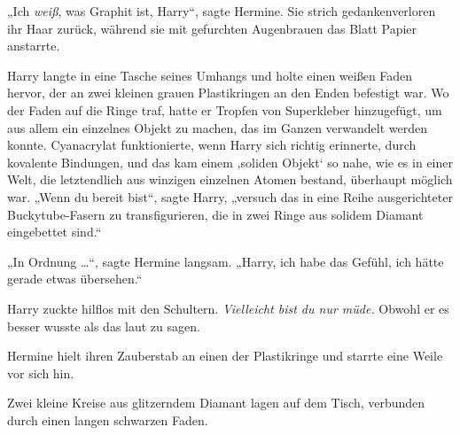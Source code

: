 „Ich \emph{weiß}, was Graphit ist, Harry“, sagte Hermine. Sie strich gedankenverloren ihr Haar zurück, während sie mit gefurchten Augenbrauen das Blatt Papier anstarrte.

Harry langte in eine Tasche seines Umhangs und holte einen weißen Faden hervor, der an zwei kleinen grauen Plastikringen an den Enden befestigt war. Wo der Faden auf die Ringe traf, hatte er Tropfen von Superkleber hinzugefügt, um aus allem ein einzelnes Objekt zu machen, das im Ganzen verwandelt werden konnte. Cyanacrylat funktionierte, wenn Harry sich richtig erinnerte, durch kovalente Bindungen, und das kam einem ‚soliden Objekt‘ so nahe, wie es in einer Welt, die letztendlich aus winzigen einzelnen Atomen bestand, überhaupt möglich war.
„Wenn du bereit bist“, sagte Harry, „versuch das in eine Reihe ausgerichteter Buckytube-Fasern zu transfigurieren, die in zwei Ringe aus solidem Diamant eingebettet sind.“

„In Ordnung …“, sagte Hermine langsam.
„Harry, ich habe das Gefühl, ich hätte gerade etwas übersehen.“

Harry zuckte hilflos mit den Schultern. \emph{Vielleicht bist du nur müde.} Obwohl er es besser wusste als das laut zu sagen.

Hermine hielt ihren Zauberstab an einen der Plastikringe und starrte eine Weile vor sich hin.

Zwei kleine Kreise aus glitzerndem Diamant lagen auf dem Tisch, verbunden durch einen langen schwarzen Faden.

